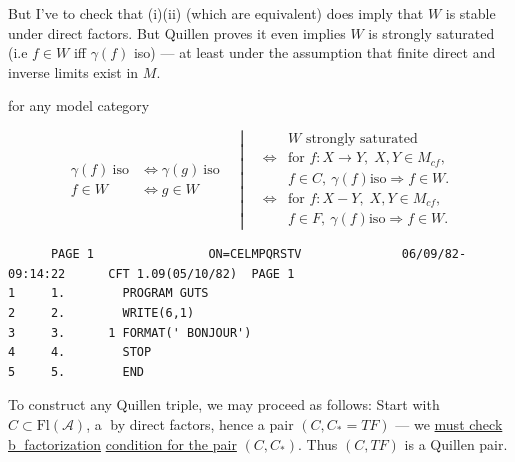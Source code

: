 {But I've to check that (i)(ii) (which are equivalent) does imply that \uline{$W$} is stable under direct factors. But Quillen proves it even implies $W$ is strongly saturated (i.e $f\in W$ iff $\gamma(f)$ iso) --- at least under the assumption that finite direct and inverse limits exist in $M$.

for any model category


\[
\begin{aligned}\gamma(f)\ \mathrm{iso}&\Longleftrightarrow\gamma(g)\ \mathrm{iso}\\
f\in W&\Longleftrightarrow g\in W\end{aligned}
\quad\left|\quad
\begin{aligned}
&W\text{ strongly saturated}\\
\Longleftrightarrow{}&\text{for }f:X\to Y,\;X,Y\in M_{cf},\\
&f\in C,\ \gamma(f)\mathrm{iso}\Rightarrow f\in W.\\
\Longleftrightarrow{}&\text{for }f:X-Y,\;X,Y\in M_{cf},\\
&f\in F,\ \gamma(f)\mathrm{iso}\Rightarrow f\in W.
\end{aligned}\right.
\]}

{\fontsize{5}{6}\selectfont
\begin{verbatim}
      PAGE 1                ON=CELMPQRSTV              06/09/82-09:14:22      CFT 1.09(05/10/82)  PAGE 1
1     1.        PROGRAM GUTS
2     2.        WRITE(6,1)
3     3.      1 FORMAT(' BONJOUR')
4     4.        STOP
5     5.        END
\end{verbatim}
}


To construct any Quillen triple, we may proceed as follows: Start with  $C\subset\mathrm{Fl}(\mathscr A)$, \textcircled{a}   by direct factors, hence a pair $(C,C_*=TF)$ --- we \uline{must check \textcircled{b} factorization} \uline{condition for the pair} $(C,C_*)$.  Thus $(C,TF)$ is a Quillen pair.


